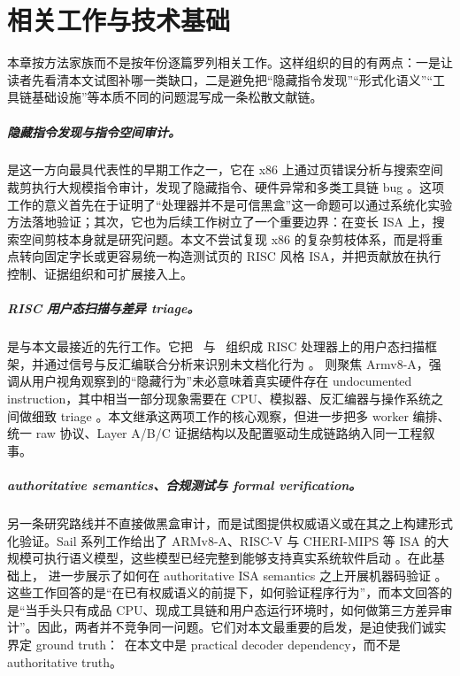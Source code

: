 \chapter{相关工作与技术基础}

本章按方法家族而不是按年份逐篇罗列相关工作。这样组织的目的有两点：一是让读者先看清本文试图补哪一类缺口，二是避免把“隐藏指令发现”“形式化语义”“工具链基础设施”等本质不同的问题混写成一条松散文献链。

\paragraph{隐藏指令发现与指令空间审计。}
 是这一方向最具代表性的早期工作之一，它在 x86 上通过页错误分析与搜索空间裁剪执行大规模指令审计，发现了隐藏指令、硬件异常和多类工具链 bug \citep{domas2017breakingx86}。这项工作的意义首先在于证明了“处理器并不是可信黑盒”这一命题可以通过系统化实验方法落地验证；其次，它也为后续工作树立了一个重要边界：在变长 ISA 上，搜索空间剪枝本身就是研究问题。本文不尝试复现 x86 的复杂剪枝体系，而是将重点转向固定字长或更容易统一构造测试页的 RISC 风格 ISA，并把贡献放在执行控制、证据组织和可扩展接入上。

\paragraph{RISC 用户态扫描与差异 triage。}
 是与本文最接近的先行工作。它把 \ptracebackend\ 与 \memcage\ 组织成 RISC 处理器上的用户态扫描框架，并通过信号与反汇编联合分析来识别未文档化行为 \citep{Dofferhoff_2020}。 则聚焦 Armv8-A，强调从用户视角观察到的“隐藏行为”未必意味着真实硬件存在 undocumented instruction，其中相当一部分现象需要在 CPU、模拟器、反汇编器与操作系统之间做细致 triage \citep{Strupe_2020}。本文继承这两项工作的核心观察，但进一步把多 worker 编排、统一 raw 协议、Layer A/B/C 证据结构以及配置驱动生成链路纳入同一工程叙事。

\paragraph{authoritative semantics、合规测试与 formal verification。}
另一条研究路线并不直接做黑盒审计，而是试图提供权威语义或在其之上构建形式化验证。Sail 系列工作给出了 ARMv8-A、RISC-V 与 CHERI-MIPS 等 ISA 的大规模可执行语义模型，这些模型已经完整到能够支持真实系统软件启动 \citep{Armstrong_2019}。在此基础上， 进一步展示了如何在 authoritative ISA semantics 之上开展机器码验证 \citep{Sammler_2022}。这些工作回答的是“在已有权威语义的前提下，如何验证程序行为”，而本文回答的是“当手头只有成品 CPU、现成工具链和用户态运行环境时，如何做第三方差异审计”。因此，两者并不竞争同一问题。它们对本文最重要的启发，是迫使我们诚实界定 ground truth：\capstone\ 在本文中是 practical decoder dependency，而不是 authoritative truth。

